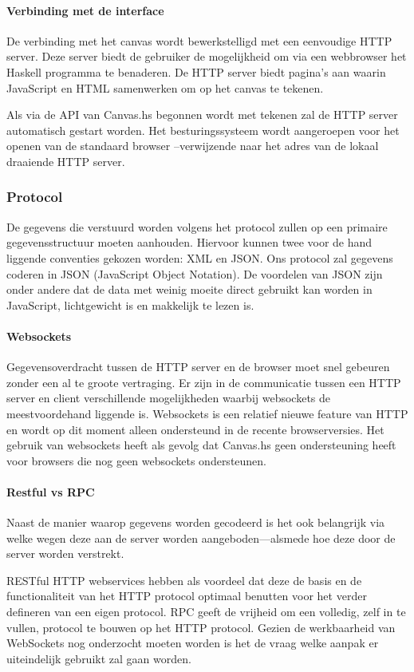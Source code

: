 \paragraph{Verbinding met de interface}
De verbinding met het canvas wordt bewerkstelligd met een eenvoudige HTTP server. Deze server biedt de gebruiker de mogelijkheid om via een webbrowser het Haskell programma te benaderen. De HTTP server biedt pagina's aan waarin JavaScript en HTML samenwerken om op het canvas te tekenen.

Als via de API van Canvas.hs begonnen wordt met tekenen zal de HTTP server automatisch gestart worden. Het besturingssysteem wordt aangeroepen voor het openen van de standaard browser --verwijzende naar het adres van de lokaal draaiende HTTP server.
\subsubsection{Protocol}
De gegevens die verstuurd worden volgens het protocol zullen op een primaire gegevensstructuur moeten aanhouden. Hiervoor kunnen twee voor de hand liggende conventies gekozen worden: XML en JSON. Ons protocol zal gegevens coderen in JSON (JavaScript Object Notation). De voordelen van JSON zijn onder andere dat de data met weinig moeite direct gebruikt kan worden in JavaScript, lichtgewicht is en makkelijk te lezen is.
\paragraph{Websockets}
Gegevensoverdracht tussen de HTTP server en de browser moet snel gebeuren zonder een al te groote vertraging. Er zijn in de communicatie tussen een HTTP server en client verschillende mogelijkheden waarbij websockets de meestvoordehand liggende is. Websockets is een relatief nieuwe feature van HTTP en wordt op dit moment alleen ondersteund in de recente browserversies. Het gebruik van websockets heeft als gevolg dat Canvas.hs geen ondersteuning heeft voor browsers die nog geen websockets ondersteunen.

\paragraph{Restful vs RPC}
Naast de manier waarop gegevens worden gecodeerd is het ook belangrijk via welke wegen deze aan de server worden aangeboden—alsmede hoe deze door de server worden verstrekt.

RESTful HTTP webservices hebben als voordeel dat deze de basis en de functionaliteit van het HTTP protocol optimaal benutten voor het verder defineren van een eigen protocol. RPC geeft de vrijheid om een volledig, zelf in te vullen, protocol te bouwen op het HTTP protocol. Gezien de werkbaarheid van WebSockets nog onderzocht moeten worden is het de vraag welke aanpak er uiteindelijk gebruikt zal gaan worden.

